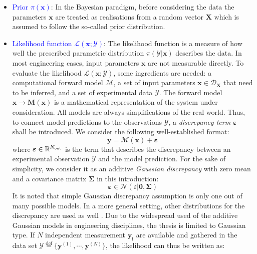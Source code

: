 \begin{itemize}[left=0pt]
    \item \textcolor{blue}{Prior $\pi(\boldsymbol{x})$}: In the Bayesian paradigm, before considering the data the parameters $\boldsymbol{x}$ are treated as realisations from a random vector $\boldsymbol{X}$ which is assumed to follow the so-called prior distribution.
    

    \item \textcolor{blue}{Likelihood function $\mathcal{L}(\boldsymbol{x};\mathcal{Y})$}: The likelihood function is a measure of how well the prescribed parametric distribution $\pi(\mathcal{Y}|\boldsymbol{x})$ describes the data. In most engineering cases, input parameters $\boldsymbol{x}$ are not measurable directly. To evaluate the likelihood $\mathcal{L}(\boldsymbol{x};\mathcal{Y})$, some ingredients are needed: a computational forward model $\mathcal{M}$, a set of input parameters $\boldsymbol{x} \in\mathcal{D}_{\boldsymbol{X}}$ that need to be inferred, and a set of experimental data $\mathcal{Y}$.
    The forward model $\boldsymbol{x} \rightarrow \boldsymbol{M}(\boldsymbol{x})$ is a mathematical representation of the system under consideration. All models are always simplifications of the real world. Thus, to connect model predictions to the observations $\mathcal{Y}$, a \textit{discrepancy term} $\boldsymbol{\varepsilon}$ shall be introduced. We consider the following well-established format:
    \begin{equation}
        \label{eq: discrepancy term}
        \boldsymbol{y} = \mathcal{M}(\boldsymbol{x}) + \boldsymbol{\varepsilon}
    \end{equation}
    where $\boldsymbol{\varepsilon} \in \mathbb{R}^{N_{\rm{out}}}$ is the term that describes the discrepancy between an experimental observation $\mathcal{Y}$ and the model prediction. For the sake of simplicity, we consider it as an additive \textit{Gaussian discrepancy} with zero mean and a covariance matrix $\boldsymbol{\Sigma}$ in this introduction:
        \begin{equation}
            \label{eq: Gaussian discrepancy}
            \boldsymbol{\varepsilon} \in \mathcal{N}(\varepsilon|\boldsymbol{0},\boldsymbol{\Sigma})
        \end{equation}
    It is noted that simple Gaussian discrepancy assumption is only one out of many possible models. In a more general setting, other distributions for the discrepancy are used as well \citep{UQdoc}. Due to the widespread used of the additive Gaussian models in engineering disciplines, the thesis is limited to Gaussian type. If $N$ independent measurement $\boldsymbol{y_{i}}$ are available and gathered in the data set $\mathcal{Y} \stackrel{\mathrm{def}}{=} \{{\boldsymbol{y}^{(1)}},\cdots,{\boldsymbol{y}^{(N)}}\}$, the likelihood can thus be written as:

\end{itemize}
